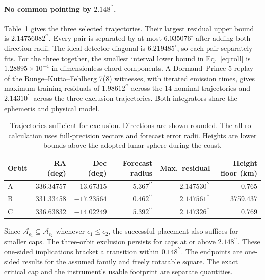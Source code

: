 \documentclass[10pt,letterpaper]{article}
\newcommand{\degc}{^{\circ}}
\newcommand{\as}{^{\prime\prime}}
\begin{document}
\paragraph{No common pointing by $2.148\as$.}
Table~\ref{tab:witness} gives the three selected trajectories. Their largest residual upper bound is $2.14756082\as$. Every pair is separated by at most $6.035076\degc$ after adding both direction radii. The ideal detector diagonal is $6.219485\degc$, so each pair separately fits. For the three together, the smallest interval lower bound in Eq.~\eqref{eq:roll} is $1.28895\times10^{-4}$ in dimensionless chord components. A Dormand--Prince 5 replay of the Runge--Kutta--Fehlberg 7(8) witnesses, with iterated emission times, gives maximum training residuals of $1.98612\as$ across the 14 nominal trajectories and $2.14310\as$ across the three exclusion trajectories. Both integrators share the ephemeris and physical model.

\begin{table}[htbp]
\centering
\caption{Trajectories sufficient for exclusion. Directions are shown rounded. The all-roll calculation uses full-precision vectors and forecast error radii. Heights are lower bounds above the adopted lunar sphere during the coast.}
\label{tab:witness}
\begin{tabular}{lrrrrr}
\toprule
Orbit & RA (deg) & Dec (deg) & Forecast radius & Max.\ residual & Height floor (km)\\
\midrule
A & 336.34757 & $-13.67315$ & $5.367\as$ & $2.147530\as$ & 0.765\\
B & 331.33458 & $-17.23564$ & $0.462\as$ & $2.147561\as$ & 3759.437\\
C & 336.63832 & $-14.02249$ & $5.392\as$ & $2.147326\as$ & 0.769\\
\bottomrule
\end{tabular}
\end{table}

Since $\mathcal A_{\epsilon_1}\subseteq\mathcal A_{\epsilon_2}$ whenever $\epsilon_1\leq\epsilon_2$, the successful placement also suffices for smaller caps. The three-orbit exclusion persists for caps at or above $2.148\as$. These one-sided implications bracket a transition within $0.148\as$. The endpoints are one-sided results for the assumed family and freely rotatable square. The exact critical cap and the instrument's usable footprint are separate quantities.
\end{document}
